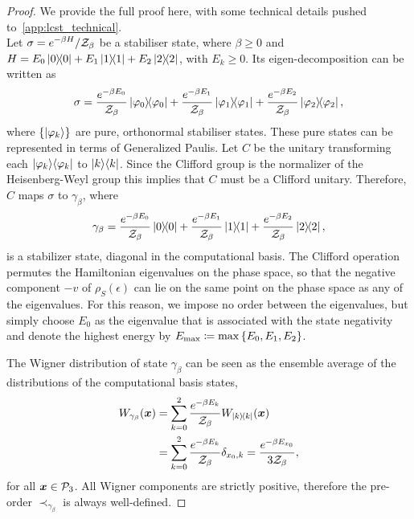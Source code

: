 \documentclass[pra,
aps,
twocolumn,
superscriptaddress,
groupedaddress,
nofootinbib,
reprint
]{revtex4-1}
\begin{document}
\begin{proof}
	We provide the full proof here, with some technical details pushed to~\cref{app:lcst_technical}.\\

Let $\displaystyle \sigma = e^{-\beta H} / \mathcal{Z}_\beta$ be a stabiliser state, where $\beta \geq 0$ and $H = E_0 \ketbra{0} + E_1 \ketbra{1} + E_2 \ketbra{2}$, with $E_k \geq 0$.
Its eigen-decomposition can be written as 
\begin{equation}
	\sigma = \frac{e^{-\beta E_0}}{\mathcal{Z}_\beta} \ketbra{\varphi_0} + \frac{e^{-\beta E_1}}{\mathcal{Z}_\beta} \ketbra{\varphi_1} + \frac{e^{-\beta E_2}}{\mathcal{Z}_\beta} \ketbra{\varphi_2},
\end{equation}
where $\{\ket{\varphi_k}\}$ are pure, orthonormal stabiliser states. These pure states can be represented in terms of Generalized Paulis. Let $C$ be the unitary transforming each $|\varphi_k\rangle\langle\varphi_k|$ to $|k\rangle\langle k|$. Since the Clifford group is the normalizer of the Heisenberg-Weyl group this implies that $C$ must be a Clifford unitary. Therefore, $C$ maps $\sigma$ to $\gamma_\beta$, where 
\begin{equation}
\gamma_\beta = \frac{e^{-\beta E_0}}{\mathcal{Z}_\beta} \ketbra{0} + \frac{e^{-\beta E_1}}{\mathcal{Z}_\beta} \ketbra{1} + \frac{e^{-\beta E_2}}{\mathcal{Z}_\beta} \ketbra{2},
\end{equation}
is a stabilizer state, diagonal in the computational basis. The Clifford operation permutes the Hamiltonian eigenvalues on the phase space, so that the negative component $-v$ of $\rho_S(\epsilon)$ can lie on the same point on the phase space as any of the eigenvalues.
For this reason, we impose no order between the eigenvalues, but simply choose $E_0$ as the eigenvalue that is associated with the state negativity and denote the highest energy by $E_{\rm{max}} \coloneqq \max{\{E_0, E_1, E_2\}}$.

The Wigner distribution of state $\gamma_\beta$ can be seen as the ensemble average of the distributions of the computational basis states,
\begin{align}
	\W[\bmx]{\gamma_\beta} &= \sum\limits_{k=0}^2 \frac{e^{-\beta E_k}}{\Z_\beta}\W[\bmx]{\ketbra{k}} \nonumber\\
	&= \sum\limits_{k=0}^2 \frac{e^{-\beta E_k}}{\Z_\beta} \delta_{x_0, k} = \frac{e^{-\beta E_{x_0}}}{3\Z_\beta},
\end{align}
for all $\bm{x} \in \mathcal{P}_3$. 
All Wigner components are strictly positive, therefore the pre-order $\prec_{\gamma_\beta}$ is always well-defined.


\end{proof}
\end{document}
